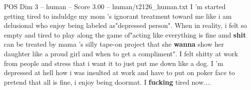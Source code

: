 \begin{textsample}{POS Dim 3 – human – Score 3.00 – human/t2126\_human.txt}  \label{ex:f3_pos_012}
I 'm started getting tired to induldge my mom 's ignorant treatment toward me like i am delusional who enjoy being labeled as"depressed person".
When in reality, i felt so empty and tired to play along the game of"acting like everything is fine amd \textbf{shit} can be treated by mama 's silly tape-on project that she \textbf{wanna} show her daughter like a proud girl and when to get a compliment".
I felt shitty at work from people and stress that i want it to just put me down like a dog.
I 'm depressed at hell how i was insulted at work and have to put on poker face to pretend that all is fine, i enjoy being doormat.
I \textbf{fucking} tired now....

\end{textsample}
